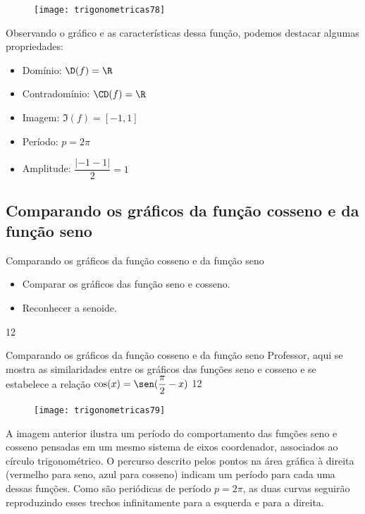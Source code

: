 \begin{figure}[H]
\centering

\texttt{[image: trigonometricas78]}
\end{figure}

Observando o gráfico e as características dessa função, podemos destacar algumas propriedades:
\begin{itemize}
\item Domínio: $\D(f)=\R$
\item Contradomínio: $\CD(f)=\R$
\item Imagem: $\Im(f)=[-1,1]$
\item Período: $p=2\pi$
\item Amplitude: $\dfrac{|-1-1|}{2}=1$
\end{itemize}

\clearpage
\subsection{Comparando os gráficos da função cosseno e da função seno}
\begin{objectives}{Comparando os gráficos da função cosseno e da função seno}
{
\begin{itemize}
\item Comparar os gráficos das função seno e cosseno.
\item Reconhecer a senoide.
\end{itemize}
}{1}{2}
\end{objectives}
\begin{sugestions}{Comparando os gráficos da função cosseno e da função seno}
{
Professor, aqui se mostra as similaridades entre os gráficos das funções seno e cosseno e se estabelece a relação $\cos(x)=\sen(\dfrac{\pi}{2}-x)$
}{1}{2}
\end{sugestions}


\begin{figure}[H]
\centering

\texttt{[image: trigonometricas79]}
\end{figure}

A imagem anterior ilustra um período do comportamento das funções seno e cosseno pensadas em um mesmo sistema de eixos coordenador, associados ao círculo trigonométrico. O percurso descrito pelos pontos na área gráfica à direita (vermelho para seno, azul para cosseno) indicam um período para cada uma dessas funções. Como são periódicas de período $p=2\pi$, as duas curvas seguirão reproduzindo esses trechos infinitamente para a esquerda e para a direita.

